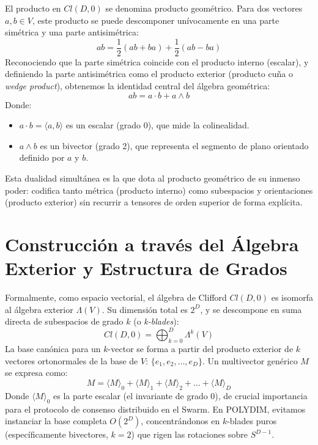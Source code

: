 El producto en $Cl(D,0)$ se denomina producto geométrico. Para dos vectores $a,b \in V$, este producto se puede descomponer unívocamente en una parte simétrica y una parte antisimétrica:
\begin{equation}
    ab = \frac{1}{2}(ab + ba) + \frac{1}{2}(ab - ba)
\end{equation}
Reconociendo que la parte simétrica coincide con el producto interno (escalar), y definiendo la parte antisimétrica como el producto exterior (producto cuña o \textit{wedge product}), obtenemos la identidad central del álgebra geométrica:
\begin{equation}
    ab = a \cdot b + a \wedge b
\end{equation}
Donde:
\begin{itemize}
    \item $a \cdot b = \langle a, b \rangle$ es un escalar (grado 0), que mide la colinealidad.
    \item $a \wedge b$ es un bivector (grado 2), que representa el segmento de plano orientado definido por $a$ y $b$.
\end{itemize}
Esta dualidad simultánea es la que dota al producto geométrico de su inmenso poder: codifica tanto métrica (producto interno) como subespacios y orientaciones (producto exterior) sin recurrir a tensores de orden superior de forma explícita.

\section{Construcción a través del Álgebra Exterior y Estructura de Grados}

Formalmente, como espacio vectorial, el álgebra de Clifford $Cl(D,0)$ es isomorfa al álgebra exterior $\Lambda(V)$. Su dimensión total es $2^D$, y se descompone en suma directa de subespacios de grado $k$ (o \textit{k-blades}):
\begin{equation}
    Cl(D,0) = \bigoplus_{k=0}^{D} \Lambda^k(V)
\end{equation}
La base canónica para un $k$-vector se forma a partir del producto exterior de $k$ vectores ortonormales de la base de $V$: $\{e_1, e_2, \dots, e_D\}$. Un multivector genérico $M$ se expresa como:
\begin{equation}
    M = \langle M \rangle_0 + \langle M \rangle_1 + \langle M \rangle_2 + \dots + \langle M \rangle_D
\end{equation}
Donde $\langle M \rangle_0$ es la parte escalar (el invariante de grado 0), de crucial importancia para el protocolo de consenso distribuido en el Swarm. En POLYDIM, evitamos instanciar la base completa $O(2^D)$, concentrándonos en $k$-blades puros (específicamente bivectores, $k=2$) que rigen las rotaciones sobre $S^{D-1}$.

